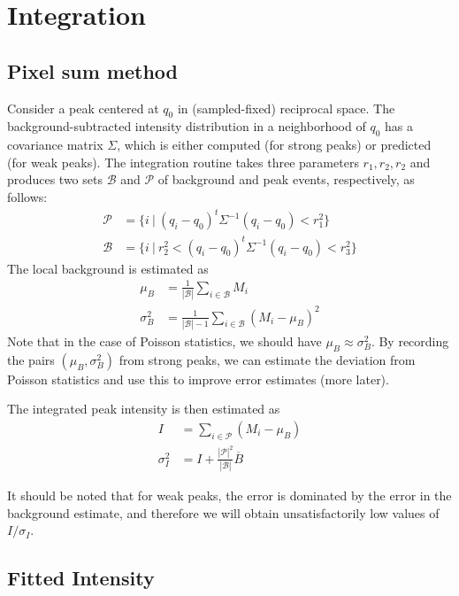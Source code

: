 \documentclass[11pt,a4paper]{article}
\newcommand{\calP}{\mathcal{P}}
\newcommand{\calB}{\mathcal{B}}
\begin{document}
\section{Integration} \label{integration}

\subsection{Pixel sum method}

Consider a peak centered at $q_0$ in (sampled-fixed) reciprocal space. The background-subtracted intensity distribution in a neighborhood of $q_0$ has a covariance matrix $\Sigma$, which is either computed (for strong peaks) or predicted (for weak peaks). The integration routine takes three parameters $r_1, r_2, r_2$ and produces
two sets $\calB$ and $\calP$ of background and peak events, respectively, as follows:
\begin{align}
  \calP &= \{ i \ | \ (q_i-q_0)^t \Sigma^{-1} (q_i-q_0) < r_1^2 \} \\
  \calB &= \{ i \ | \ r_2^2 < (q_i-q_0)^t \Sigma^{-1} (q_i-q_0) < r_3^2 \}
\end{align}
The local background is estimated as
\begin{align}
  \mu_B &= \frac{1}{|\calB|} \sum_{i \in \calB} M_i \\
  \sigma^2_B &= \frac{1}{|\calB|-1} \sum_{i \in \calB} (M_i - \mu_B)^2
\end{align}
Note that in the case of Poisson statistics, we should have $\mu_B \approx \sigma^2_B$. By recording the pairs $(\mu_B, \sigma^2_B)$ from strong peaks, we can estimate the deviation from Poisson statistics and use this to improve error estimates (more later).

The integrated peak intensity is then estimated as
\begin{align}
  I &= \sum_{i \in \calP} (M_i - \mu_B) \\
  \sigma^2_I &= I + \frac{|\calP|^2}{|\calB|} \overline{B}
\end{align}

It should be noted that for weak peaks, the error is dominated by the error in the background estimate, and therefore we will obtain unsatisfactorily low values of $I/\sigma_I$.


\subsection{Fitted Intensity}
\end{document}
